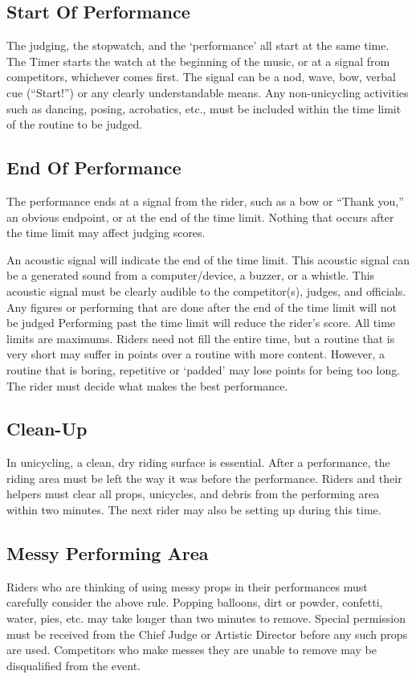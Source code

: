 \subsection{Start Of Performance}
The judging, the stopwatch, and the `performance' all start at the same time.
The Timer starts the watch at the beginning of the music, or at a signal from competitors, whichever comes first.
The signal can be a nod, wave, bow, verbal cue (``Start!'') or any clearly understandable means.
Any non-unicycling activities such as dancing, posing, acrobatics, etc., must be included within the time limit of the routine to be judged.

\subsection{End Of Performance}
The performance ends at a signal from the rider, such as a bow or ``Thank you,'' an obvious endpoint, or at the end of the time limit.
Nothing that occurs after the time limit may affect judging scores.

An acoustic signal will indicate the end of the time limit.
This acoustic signal can be a generated sound from a computer/device, a buzzer, or a whistle.
This acoustic signal must be clearly audible to the competitor(s), judges, and officials.
Any figures or performing that are done after the end of the time limit will not be judged Performing past the time limit will reduce the rider's score.
All time limits are maximums.
Riders need not fill the entire time, but a routine that is very short may suffer in points over a routine with more content.
However, a routine that is boring, repetitive or `padded' may lose points for being too long.
The rider must decide what makes the best performance.

\subsection{Clean-Up}
In unicycling, a clean, dry riding surface is essential.
After a performance, the riding area must be left the way it was before the performance.
Riders and their helpers must clear all props, unicycles, and debris from the performing area within two minutes.
The next rider may also be setting up during this time.

\subsection{Messy Performing Area}
Riders who are thinking of using messy props in their performances must carefully consider the above rule.
Popping balloons, dirt or powder, confetti, water, pies, etc.
may take longer than two minutes to remove.
Special permission must be received from the Chief Judge or Artistic Director before any such props are used.
Competitors who make messes they are unable to remove may be disqualified from the event.
